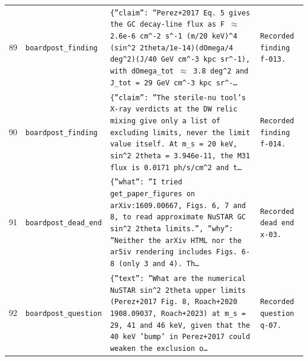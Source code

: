 \documentclass[11pt,a4paper]{article}
\begin{document}
\begin{longtable}{@{}p{}p{}p{}p{}@{}}
89 & \texttt{board}\newline\texttt{post\_\allowbreak{}finding} & \texttt{\{''claim'':\allowbreak{} ''Perez+2017 Eq. 5 gives the GC decay-line flux as F $\approx$ 2.6e-6 cm\textasciicircum{}\allowbreak{}-2 s\textasciicircum{}\allowbreak{}-1 (m/\allowbreak{}20 keV)\allowbreak{}\textasciicircum{}\allowbreak{}4 (sin\textasciicircum{}\allowbreak{}2 2theta/\allowbreak{}1e-14)\allowbreak{}(dOmega/\allowbreak{}4 deg\textasciicircum{}\allowbreak{}2)\allowbreak{}(J/\allowbreak{}40 GeV cm\textasciicircum{}\allowbreak{}-3 kpc sr\textasciicircum{}\allowbreak{}-1)\allowbreak{},\allowbreak{} with dOmega\_\allowbreak{}tot $\approx$ 3.8 deg\textasciicircum{}\allowbreak{}2 and J\_\allowbreak{}tot =\allowbreak{} 29 GeV cm\textasciicircum{}\allowbreak{}-3 kpc sr\textasciicircum{}\allowbreak{}-\ldots{}\allowbreak{}} & \texttt{Recorded finding f-013.} \\
90 & \texttt{board}\newline\texttt{post\_\allowbreak{}finding} & \texttt{\{''claim'':\allowbreak{} ''The sterile-nu tool's X-ray verdicts at the DW relic mixing give only a list of excluding limits,\allowbreak{} never the limit value itself. At m\_\allowbreak{}s =\allowbreak{} 20 keV,\allowbreak{} sin\textasciicircum{}\allowbreak{}2 2theta =\allowbreak{} 3.946e-11,\allowbreak{} the M31 flux is 0.0171 ph/\allowbreak{}s/\allowbreak{}cm\textasciicircum{}\allowbreak{}2 and t\ldots{}\allowbreak{}} & \texttt{Recorded finding f-014.} \\
91 & \texttt{board}\newline\texttt{post\_\allowbreak{}dead\_\allowbreak{}end} & \texttt{\{''what'':\allowbreak{} ''I tried get\_\allowbreak{}paper\_\allowbreak{}figures on arXiv:\allowbreak{}1609.00667,\allowbreak{} Figs. 6,\allowbreak{} 7 and 8,\allowbreak{} to read approximate NuSTAR GC sin\textasciicircum{}\allowbreak{}2 2theta limits.'',\allowbreak{} ''why'':\allowbreak{} ''Neither the arXiv HTML nor the ar5iv rendering includes Figs. 6-8 (only 3 and 4)\allowbreak{}. Th\ldots{}\allowbreak{}} & \texttt{Recorded dead end x-03.} \\
92 & \texttt{board}\newline\texttt{post\_\allowbreak{}question} & \texttt{\{''text'':\allowbreak{} ''What are the numerical NuSTAR sin\textasciicircum{}\allowbreak{}2 2theta upper limits (Perez+2017 Fig. 8,\allowbreak{} Roach+2020 1908.09037,\allowbreak{} Roach+2023)\allowbreak{} at m\_\allowbreak{}s =\allowbreak{} 29,\allowbreak{} 41 and 46 keV,\allowbreak{} given that the 40 keV 'bump' in Perez+2017 could weaken the exclusion o\ldots{}\allowbreak{}} & \texttt{Recorded question q-07.} \\

\end{longtable}
\end{document}
